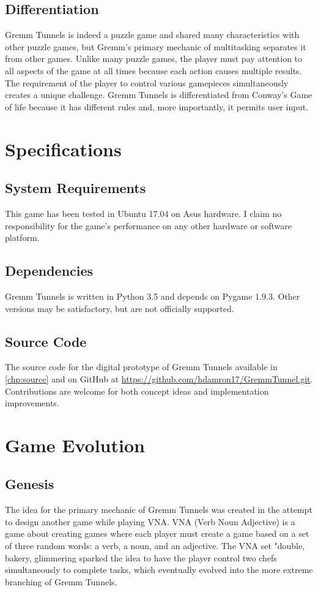 \documentclass{scrreprt}
\begin{document}
		\section{Differentiation}
			Gremm Tunnels is indeed a puzzle game and shared many characteristics with other puzzle games, but Gremm's primary mechanic of multitasking separates it from other games. Unlike many puzzle games, the player must pay attention to all aspects of the game at all times because each action causes multiple results. The requirement of the player to control various gamepieces simultaneously creates a unique challenge. Gremm Tunnels is differentiated from Conway's Game of life because it has different rules and, more importantly, it permits user input.
	
	\chapter{Specifications}
		\section{System Requirements}
			This game has been tested in Ubuntu 17.04 on Asus hardware. I claim no responsibility for the game's performance on any other hardware or software platform.
		
		\section{Dependencies}
			Gremm Tunnels is written in Python 3.5 and depends on Pygame 1.9.3. Other versions may be satisfactory, but are not officially supported.
			
		\section{Source Code}
			The source code for the digital prototype of Gremm Tunnels available in \autoref{chp:source} and on GitHub at \url{https://github.com/hdamron17/GremmTunnel.git}. Contributions are welcome for both concept ideas and implementation improvements.
	
	\chapter{Game Evolution}
			
		\section{Genesis}
			The idea for the primary mechanic of Gremm Tunnels was created in the attempt to design another game while playing VNA. VNA (Verb Noun Adjective) is a game about creating games where each player must create a game based on a set of three random words: a verb, a noun, and an adjective. The VNA set "double, bakery, glimmering sparked the idea to have the player control two chefs simultaneously to complete tasks, which eventually evolved into the more extreme branching of Gremm Tunnels.
			
\end{document}
